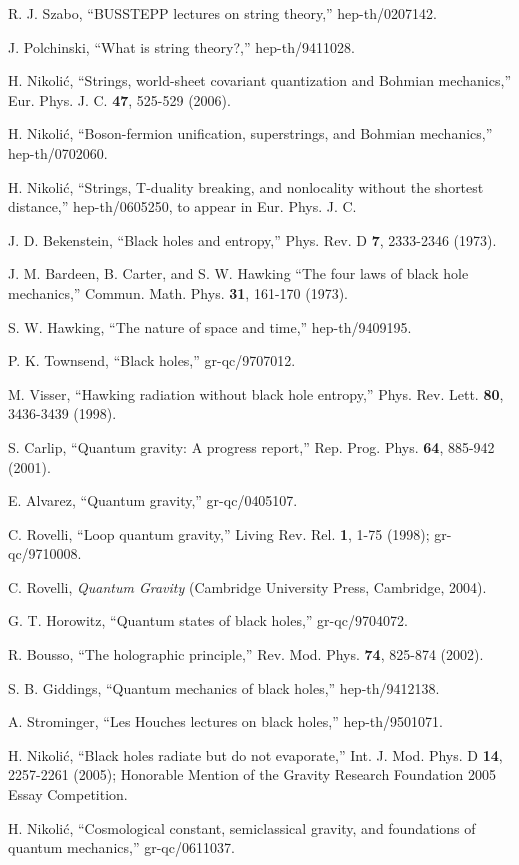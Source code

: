 \documentclass[12pt]{article}
\begin{document}
\begin{thebibliography}{99}
R. J. Szabo,
``BUSSTEPP lectures on string theory,''
hep-th/0207142.

J. Polchinski,
``What is string theory?,''
hep-th/9411028.

H. Nikoli\'c,
``Strings, world-sheet covariant quantization and Bohmian mechanics,''
Eur. Phys. J. C. {\bf 47}, 525-529 (2006).

H. Nikoli\'c, 
``Boson-fermion unification, superstrings, and Bohmian mechanics,''
hep-th/0702060.


H. Nikoli\'c,
``Strings, T-duality breaking, and nonlocality without the shortest
distance,''
hep-th/0605250, to appear in Eur. Phys. J. C.

J. D. Bekenstein,
``Black holes and entropy,''
Phys. Rev. D {\bf 7}, 2333-2346 (1973).

J. M. Bardeen, B. Carter, and S. W. Hawking
``The four laws of black hole mechanics,''
Commun. Math. Phys. {\bf 31}, 161-170 (1973).

S. W. Hawking,
``The nature of space and time,''
hep-th/9409195.

P. K. Townsend,
``Black holes,''
gr-qc/9707012.

M. Visser,
``Hawking radiation without black hole entropy,''
Phys. Rev. Lett. {\bf 80}, 3436-3439 (1998).

S. Carlip,
``Quantum gravity: A progress report,''
Rep. Prog. Phys. {\bf 64}, 885-942 (2001).

E. Alvarez,
``Quantum gravity,''
gr-qc/0405107.

C. Rovelli,
``Loop quantum gravity,''
Living Rev. Rel. {\bf 1}, 1-75 (1998); gr-qc/9710008.

C. Rovelli, {\it Quantum Gravity}
(Cambridge University Press, Cambridge, 2004).


G. T. Horowitz,
``Quantum states of black holes,''
gr-qc/9704072.

R. Bousso,
``The holographic principle,''
Rev. Mod. Phys. {\bf 74}, 825-874 (2002).

S. B. Giddings,
``Quantum mechanics of black holes,''
hep-th/9412138.

A. Strominger,
``Les Houches lectures on black holes,''
hep-th/9501071.

H. Nikoli\'c,
``Black holes radiate but do not evaporate,''
Int. J. Mod. Phys. D {\bf 14}, 2257-2261 (2005);
Honorable Mention of the Gravity Research Foundation 2005 Essay Competition.

H. Nikoli\'c,
``Cosmological constant, semiclassical gravity, and foundations
of quantum mechanics,''
gr-qc/0611037.



\end{thebibliography}
\end{document}

